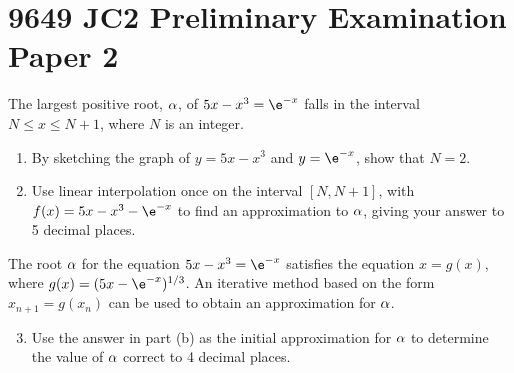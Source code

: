 \section{9649 JC2 Preliminary Examination Paper 2}

\begin{problem}
    The largest positive root, $\alpha$, of $5x - x^3 = \e^{-x}$ falls in the interval $N \leq x \leq N + 1$, where $N$ is an integer.

    \begin{enumerate}
        \item By sketching the graph of $y = 5x - x^3$ and $y = \e^{-x}$, show that $N = 2$.
        \item Use linear interpolation once on the interval $[N, N+1]$, with $f(x) = 5x - x^3 - \e^{-x}$ to find an approximation to $\alpha$, giving your answer to 5 decimal places.
    \end{enumerate}

    The root $\alpha$ for the equation $5x - x^3 = \e^{-x}$ satisfies the equation $x = g(x)$, where $g(x) = (5x - \e^{-x})^{1/3}$. An iterative method based on the form $x_{n+1} = g(x_n)$ can be used to obtain an approximation for $\alpha$.

    \begin{enumerate}
        \setcounter{enumi}{2}
        \item Use the answer in part (b) as the initial approximation for $\alpha$ to determine the value of $\alpha$ correct to 4 decimal places.
    \end{enumerate}
\end{problem}
